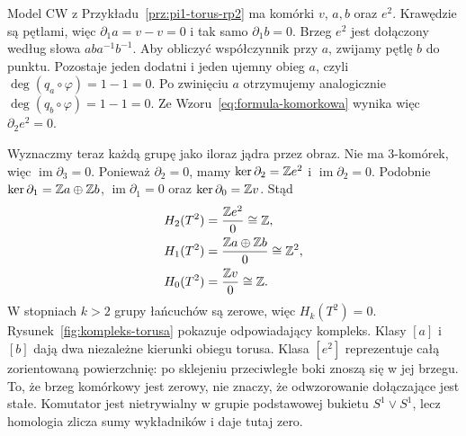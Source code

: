 \begin{przyklad}[Torus]
\label{prz:homologia-cw-torus}
Model CW z
Przykładu~\ref{prz:pi1-torus-rp2}
ma komórki $v$,
$a,b$ oraz $e^2$.
Krawędzie są pętlami, więc
$\partial_1a=v-v=0$ i tak samo $\partial_1b=0$.
Brzeg $e^2$ jest dołączony
według słowa $aba^{-1}b^{-1}$.
Aby obliczyć współczynnik przy $a$, zwijamy pętlę $b$ do punktu.
Pozostaje jeden dodatni i jeden ujemny obieg $a$, czyli
$\deg(q_a\circ\varphi)=1-1=0$. Po zwinięciu $a$ otrzymujemy
analogicznie $\deg(q_b\circ\varphi)=1-1=0$.
Ze Wzoru~\eqref{eq:formula-komorkowa} wynika więc $\partial_2e^2=0$.

Wyznaczmy teraz każdą grupę jako iloraz jądra przez obraz.
Nie ma $3$-komórek, więc $\operatorname{im}\partial_3=0$.
Ponieważ $\partial_2=0$, mamy
$\ker\partial_2=\mathbb{Z} e^2$ i $\operatorname{im}\partial_2=0$.
Podobnie $\ker\partial_1=\mathbb{Z} a\oplus\mathbb{Z} b$,
$\operatorname{im}\partial_1=0$ oraz $\ker\partial_0=\mathbb{Z} v$.
Stąd
\[
 \begin{aligned}
 H_2(T^2)&=\frac{\mathbb{Z} e^2}{0}\cong\mathbb{Z},\\
 H_1(T^2)&=\frac{\mathbb{Z} a\oplus\mathbb{Z} b}{0}\cong\mathbb{Z}^2,\\
 H_0(T^2)&=\frac{\mathbb{Z} v}{0}\cong\mathbb{Z}.
 \end{aligned}
\]
W stopniach $k>2$ grupy łańcuchów są zerowe, więc $H_k(T^2)=0$.
Rysunek~\ref{fig:kompleks-torusa}
pokazuje odpowiadający kompleks.
Klasy $[a]$ i $[b]$ dają dwa niezależne kierunki obiegu torusa.
Klasa $[e^2]$ reprezentuje całą zorientowaną powierzchnię:
po sklejeniu przeciwległe boki znoszą się w jej brzegu.
To, że brzeg komórkowy jest zerowy, nie znaczy,
że odwzorowanie dołączające jest stałe. Komutator jest nietrywialny
w grupie podstawowej bukietu $S^1\vee S^1$, lecz
homologia zlicza sumy wykładników i daje tutaj zero.
\end{przyklad}

